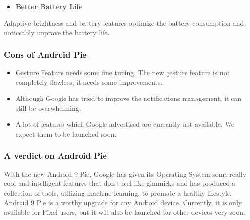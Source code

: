 \documentclass[12pt]{article}
\begin{document}
\begin{itemize}
	\item \textbf{\textcolor[HTML]{4A4A4A}{Better Battery Life}}
\end{itemize}\par

\textcolor[HTML]{4A4A4A}{Adaptive brightness and battery features optimize the battery consumption and noticeably improve the battery life.}\par

\textcolor[HTML]{4A4A4A}{ }\par

\subsubsection*{Cons of Android Pie}
\begin{itemize}
	\item \textcolor[HTML]{4A4A4A}{Gesture Feature needs some fine tuning. The new gesture feature is not completely flawless, it needs some improvements.}\par

	\item \textcolor[HTML]{4A4A4A}{Although Google has tried to improve the notifications management, it can still be overwhelming.}\par

	\item \textcolor[HTML]{4A4A4A}{A lot of features which Google advertised are currently not available. We expect them to be launched soon.}
\end{itemize}\par

\subsubsection*{A verdict on Android Pie}
\textcolor[HTML]{4A4A4A}{With the new Android 9 Pie, Google has given its Operating System some really cool and intelligent features that don't feel like gimmicks and has produced a collection of tools, utilizing machine learning, to promote a healthy lifestyle. Android 9 Pie is a worthy upgrade for any Android device. Currently, it is only available for Pixel users, but it will also be launched for other devices very soon.}\par


\vspace{\baselineskip}

\printbibliography
\end{document}
